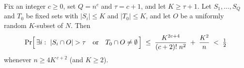\begin{lemma}\label{lem:n5-union}
Fix an integer $c\ge 0$, set $Q=n^{c}$ and $\tau=c+1$, and let $K\ge\tau+1$.  Let
$S_1,\dots,S_Q$ and $T_0$ be fixed sets with $|S_i|\le K$ and $|T_0|\le K$, and
let $O$ be a uniformly random $K$-subset of $N$.  Then
\[
  \Pr\Bigl[\,\exists i:\ |S_i\cap O|>\tau\ \ \text{ or }\ \ T_0\cap O\neq\emptyset\,\Bigr]
  \;\le\;\frac{K^{2c+4}}{(c+2)!\;n^{2}}\;+\;\frac{K^{2}}{n}\;<\;\tfrac12
\]
whenever $n\ge 4K^{\,c+2}$ (and $K\ge 2$).
\end{lemma}


